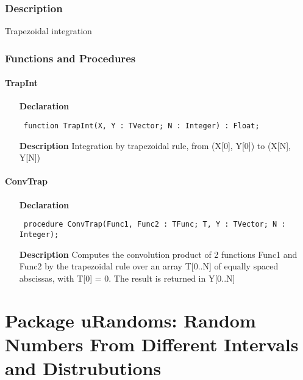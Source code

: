 \documentclass[12pt,a4paper,oneside]{report}
\newcommand{\declarationitem}[1]{\textbf{#1}}
\newcommand{\descriptiontitle}[1]{\textbf{#1}}
\newcommand{\code}[1]{\texttt{#1}}
\begin{document}
\subsection{Description}
Trapezoidal integration 
\subsection{Functions and Procedures}
\subsubsection{TrapInt}
\label{utrapint-TrapInt}
\begin{itemize}\item[\declarationitem{Declaration}\hfill]
	\begin{flushleft}
		\code{
			function TrapInt(X, Y : TVector; N : Integer) : Float;}
		
	\end{flushleft}
	
	\par
	\item[\descriptiontitle{Description}]
	Integration by trapezoidal rule, from (X[0], Y[0]) to (X[N], Y[N])
	
\end{itemize}
\subsubsection{ConvTrap}
\label{utrapint-ConvTrap}
\begin{itemize}\item[\declarationitem{Declaration}\hfill]
	\begin{flushleft}
		\code{
			procedure ConvTrap(Func1, Func2 : TFunc; T, Y : TVector; N : Integer);}
		
	\end{flushleft}
	
	\par
	\item[\descriptiontitle{Description}]
	Computes the convolution product of 2 functions Func1 and Func2 by the trapezoidal rule over an array T[0..N] of equally spaced abscissas, with T[0] = 0. The result is returned in Y[0..N]
	
\end{itemize}
\chapter{Package uRandoms: Random Numbers From Different Intervals and Distrubutions}\label{package-urandoms}
\end{document}
